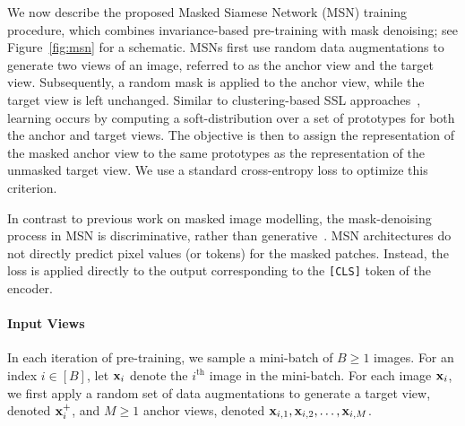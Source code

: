 \documentclass{article}
\begin{document}
We now describe the proposed Masked Siamese Network (MSN) training procedure, which combines invariance-based pre-training with mask denoising; see Figure~\ref{fig:msn} for a schematic.
MSNs first use random data augmentations to generate two views of an image, referred to as the anchor view and the target view.
Subsequently, a random mask is applied to the anchor view, while the target view is left unchanged.
Similar to clustering-based SSL approaches~\citep{caron2020unsupervised,caron2021emerging,assran2021semi}, learning occurs by computing a soft-distribution over a set of prototypes for both the anchor and target views. The objective is then to assign the representation of the masked anchor view to the same prototypes as the representation of the unmasked target view. We use a standard cross-entropy loss to optimize this criterion.

In contrast to previous work on masked image modelling, the mask-denoising process in MSN is discriminative, rather than generative~\citep{he2021masked,xie2021simmim,wei2021masked,bao2021beit,zhou2021ibot}.
MSN architectures do not directly predict pixel values (or tokens) for the masked patches.
Instead, the loss is applied directly to the output corresponding to the {\tt [CLS]} token of the encoder.

\paragraph{Input Views}
In each iteration of pre-training, we sample a mini-batch of $B \geq 1$ images.
For an index $i \in [B]$, let ${\bf x}_i$ denote the $i^{\text{th}}$ image in the mini-batch.
For each image ${\bf x}_i$, we first apply a random set of data augmentations to generate a target view, denoted ${\bf x}^+_i$, and $M \geq 1$ anchor views, denoted ${\bf x}_{i,1}, {\bf x}_{i,2}, \ldots, {\bf x}_{i,M}$.
\end{document}
